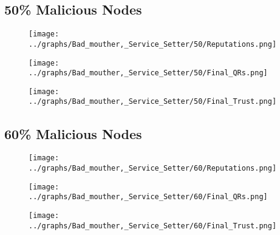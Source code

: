 \documentclass{article}
\begin{document}
  \begin{minipage}[t]{0.49\columnwidth}
    \subsection*{50\% Malicious Nodes}
        \begin{figure}[H]
            \centering
            \texttt{[image: ../graphs/Bad\_mouther,\_Service\_Setter/50/Reputations.png]}
        \end{figure}
        \begin{figure}[H]
            \centering
            \texttt{[image: ../graphs/Bad\_mouther,\_Service\_Setter/50/Final\_QRs.png]}
        \end{figure}
    \end{minipage}
    \begin{minipage}[t]{0.49\columnwidth}
        \begin{figure}[H]
            \centering
            \texttt{[image: ../graphs/Bad\_mouther,\_Service\_Setter/50/Final\_Trust.png]}
        \end{figure}
    \end{minipage}

  \begin{minipage}[t]{0.49\columnwidth}
    \subsection*{60\% Malicious Nodes}
        \begin{figure}[H]
            \centering
            \texttt{[image: ../graphs/Bad\_mouther,\_Service\_Setter/60/Reputations.png]}
        \end{figure}
        \begin{figure}[H]
            \centering
            \texttt{[image: ../graphs/Bad\_mouther,\_Service\_Setter/60/Final\_QRs.png]}
        \end{figure}
    \end{minipage}
    \begin{minipage}[t]{0.49\columnwidth}
        \begin{figure}[H]
            \centering
            \texttt{[image: ../graphs/Bad\_mouther,\_Service\_Setter/60/Final\_Trust.png]}
        \end{figure}
    \end{minipage}
\end{document}

